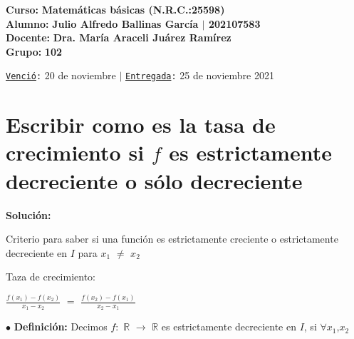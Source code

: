 \documentclass[12pt]{article}
\newenvironment{MyColorPar}[1]{%
    \leavevmode\color{#1}\ignorespaces%
}{%
}%
\begin{document}
    \large{\bf{\textsf{Curso:}}} {\bfseries{{\textcolor{Bottle Green}{Matemáticas básicas \bfseries{(N.R.C.:25598)}}}}} \\
    \large{\bf{\textsf{Alumno:}}} {\bfseries{{\textcolor{prussianblue}{Julio Alfredo Ballinas García {\large{{$\mid$}}} 202107583}}}}  \\
    \large{\bf{\textsf{Docente:}}} {\bfseries{{\textcolor{Clairvoyant}{Dra. María Araceli Juárez Ramírez}}}}\\
    \large{\bf{\textsf{Grupo:}}} {\bfseries{{\textcolor{Apple Green}{102}}}}\\

\vfill
    
\begin{center} 

    {\texttt{\textcolor{Cinnabar}{{\underline{Venció}:}}}} 20 de noviembre $\mid$ {\texttt{\textcolor{Cinnabar}{{\underline{Entregada}:}}}} 25 de noviembre 2021
    
\end{center}

\newpage

\section*{\textsf{Escribir como es la tasa de crecimiento si $f$ es estrictamente decreciente o sólo decreciente}} \vspace{0.5cm}

{\textcolor{Cinnabar}{\bfseries{Solución:}}} \vspace{0.5cm}

Criterio para saber si una función es estrictamente creciente o estrictamente decreciente en $I$ para $x_{1}$ $\neq$ $x_{2}$ \vspace{0.5cm}

{\begin{MyColorPar}{Hippie Blue}
Taza de crecimiento: \vspace{0.5cm}

\hspace{4cm} {\LARGE{$\frac{f(x_{1})-f(x_{2})}{x_{1}-x_{2}}$}} $=$ {\LARGE{$\frac{f(x_{2})-f(x_{1})}{x_{2}-x_{1}}$}} 
\end{MyColorPar}} \vspace{0.5cm} 

{\textcolor{Cinnabar}{$\bullet$}} {\bfseries{Definición:}} Decimos $f:$ $\mathbb{R}$ $\rightarrow$ $\mathbb{R}$ es estrictamente decreciente en $I$, si $\forall x_{1}$,$ x_{2}$ \vspace{0.2cm}
\end{document}

